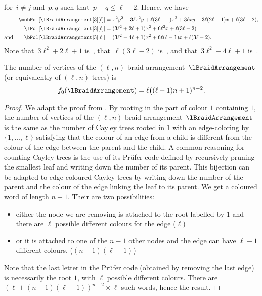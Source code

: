 \begin{example}
\[\]
for~$i \ne j$ and~$p, q$ such that~$p + q \le \ell-2$.
Hence, we have
\begin{align*}
\mobPol[{\lBraidArrangement[3][\ell]}] & = x^2 y^2 - 3 \ell x^2 y + \ell (3 \ell - 1) x^2 + 3 \ell x y - 3 \ell (2 \ell - 1) x + \ell (3 \ell - 2) , \\
\fPol[{\lBraidArrangement[3][\ell]}] & = (3 \ell^2 + 2 \ell + 1) x^2 + 6 \ell^2 x + \ell (3 \ell - 2) \\
\text{and}\qquad
\bPol[{\lBraidArrangement[3][\ell]}] & = (3 \ell^2 - 4 \ell + 1) x^2 + 6 \ell (\ell - 1) x + \ell (3 \ell - 2).
\end{align*}
Note that~$3 \ell^2 + 2 \ell + 1$ is~, that~$\ell (3 \ell - 2)$ is~, and that~$3 \ell^2 - 4 \ell + 1$ is~.
\end{example}

\begin{theorem}
\label{thm:verticeslnBraidArrangement}
The number of vertices of the $(\ell,n)$-braid arrangement~$\lBraidArrangement$ (or equivalently of $(\ell,n)$-trees) is
\[
f_0(\lBraidArrangement) = \ell \big( (\ell-1) n + 1)^{n-2}.
\]
\end{theorem}

\begin{proof}
 
We adapt the proof from \cite{CKSS04}. By rooting in the part of colour $1$ containing $1$, the number of vertices of the $(\ell,n)$-braid arrangement~$\lBraidArrangement$ is the same as the number of Cayley trees rooted in $1$ with an edge-coloring by $\{1, \ldots, \ell\}$ satisfying that the colour of an edge from a child is different from the colour of the edge between the parent and the child. A common reasoning for counting Cayley trees is the use of its Prüfer code defined by recursively pruning the smallest leaf and writing down the number of its parent. This bijection can be adapted to edge-coloured Cayley trees by writing down the number of the parent and the colour of the edge linking the leaf to its parent. We get a coloured word of length $n-1$. Their are two possibilities:
\begin{itemize}
\item either the node we are removing is attached to the root labelled by $1$ and there are $\ell$ possible different colours for the edge ($\ell$)
\item or it is attached to one of the $n-1$ other nodes and the edge can have $\ell-1$ different colours. ($(n-1)(\ell-1)$)
\end{itemize}
 Note that the last letter in the Prüfer code (obtained by removing the last edge) is necessarily the root $1$, with $\ell$ possible different colours.
 There are $(\ell+(n-1)(\ell-1))^{n-2} \times \ell$ such words, hence the result.
\end{proof}

